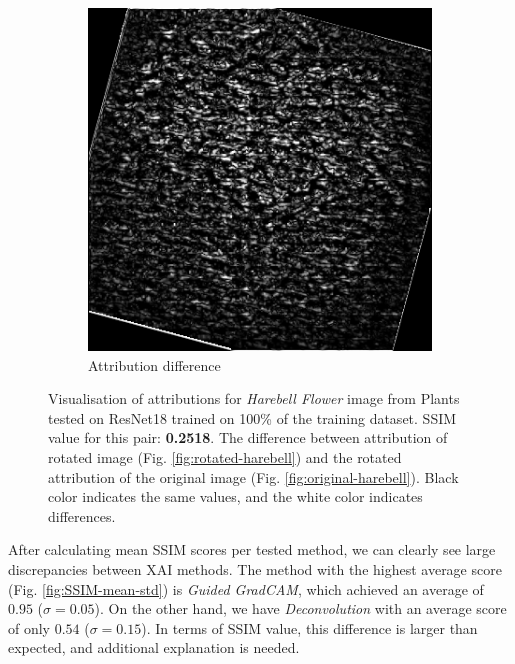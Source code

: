 \begin{figure}
\begin{subfigure}{.22\textwidth}
    \centering
    \includegraphics[width=\textwidth]{results/augment-img/harebell_flower-differences.png}
    \caption{Attribution difference}\label{fig:harebell-differences}
\end{subfigure}

 \caption{Visualisation of attributions for \textit{Harebell Flower} image from Plants \cite{plants-dataset} tested on ResNet18 \cite{he2015deep} trained on 100\% of the training dataset. SSIM value for this pair: \textbf{0.2518}. The difference between attribution of rotated image (Fig. \ref{fig:rotated-harebell}) and the rotated attribution of the original image (Fig. \ref{fig:original-harebell}). Black color indicates the same values, and the white color indicates differences.}\label{fig:xai-harebell-deconv}
\end{figure}

\hfill \break

After calculating mean SSIM scores per tested method, we can clearly see large discrepancies between XAI methods. The method with the highest average score (Fig. \ref{fig:SSIM-mean-std}) is \textit{Guided GradCAM}, which achieved an average of $0.95$ ($\sigma = 0.05$). On the other hand, we have \textit{Deconvolution} with an average score of only $0.54$ ($\sigma = 0.15$). In terms of SSIM value, this difference is larger than expected, and additional explanation is needed.

